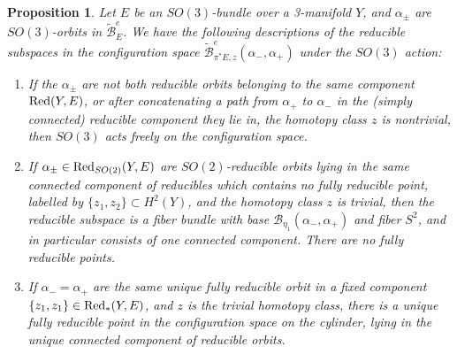 \documentclass[10pt,a4paper]{amsart}
\newcommand{\pE}{\pi^* \! E}
\newtheorem{proposition}[theorem]{Proposition}
\theoremstyle{definition}
\theoremstyle{remark}
\numberwithin{figure}{qchap}
\begin{document}
\begin{proposition}\label{action2}Let $E$ be an $SO(3)$-bundle over a 3-manifold $Y$, and $\alpha_\pm$ are $SO(3)$-orbits in $\widetilde{\mathcal B}^e_E$. We have the following descriptions of the reducible subspaces in the configuration space $\widetilde{\mathcal B}^e_{\pE,z}(\alpha_-, \alpha_+)$ under the $SO(3)$ action: \begin{enumerate}
\item If the $\alpha_\pm$ are not both reducible orbits belonging to the same component $\textup{Red}(Y,E)$, or after concatenating a path from $\alpha_+$ to $\alpha_-$ in the (simply connected) reducible component they lie in, the homotopy class $z$ is nontrivial, then $SO(3)$ acts freely on the configuration space.

\item If $\alpha_\pm \in \textup{Red}_{SO(2)}(Y,E)$ are $SO(2)$-reducible orbits lying in the same connected component of reducibles which contains no fully reducible point, labelled by $\{z_1, z_2\} \subset H^2(Y)$, and the homotopy class $z$ is trivial, then the reducible subspace is a fiber bundle with base $\mathcal B_{\eta_1}(\alpha_-, \alpha_+)$ and fiber $S^2$, and in particular consists of one connected component. There are no fully reducible points.

\item If $\alpha_- = \alpha_+$ are the same unique fully reducible orbit in a fixed component $\{z_1, z_1\} \in \textup{Red}_*(Y,E)$, and $z$ is the trivial homotopy class, there is a unique fully reducible point in the configuration space on the cylinder, lying in the unique connected component of reducible orbits.
\end{enumerate}
\end{proposition}
\end{document}
